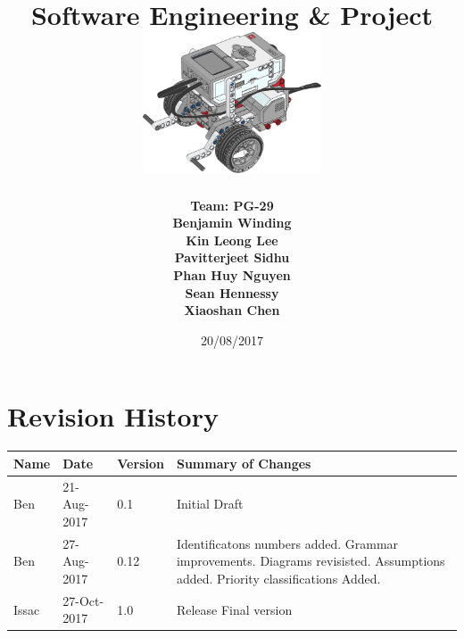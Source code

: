 \documentclass[10pt,a4paper,titlepage]{article}
\begin{document}
	
	\begin{titlepage}
		
		\title{
			\fontsize{50}{12}\\
			\vspace{20pt}
			\fontsize{20}{12}\\
			\vspace{10pt}
			\large{Software Engineering \& Project} \\
			\vspace{20pt}
			\includegraphics[width=200px]{title-page-ev3.png}					
		}
		\date{20/08/2017}
		\author{
			\bf{Team: PG-29} \\
			Benjamin Winding \\
			Kin Leong Lee \\
			Pavitterjeet Sidhu \\
			Phan Huy Nguyen \\
			Sean Hennessy \\
			Xiaoshan Chen \\
		}
		\maketitle
		
	\end{titlepage}
		 
	\tableofcontents	
	\listoffigures
	
	
	\section*{Revision History}	
	\label{revtable}	
	\begin{tabular}{|p{2.1cm}|p{2.5cm}|p{2cm}|p{4.1cm}|}		
		\hline 
		\textbf {Name} & \textbf{Date} & \textbf {Version} &\textbf {Summary of Changes} \\ 
		\hline 
		Ben & 21-Aug-2017 & 0.1 & Initial Draft\\
		\hline
		Ben & 27-Aug-2017 & 0.12 & Identificatons numbers added. Grammar improvements. Diagrams revisisted. Assumptions added. Priority classifications Added.\\  \hline
		Issac & 27-Oct-2017 & 1.0 & Release Final version\\	
		\hline 		
	\end{tabular}
\end{document}
